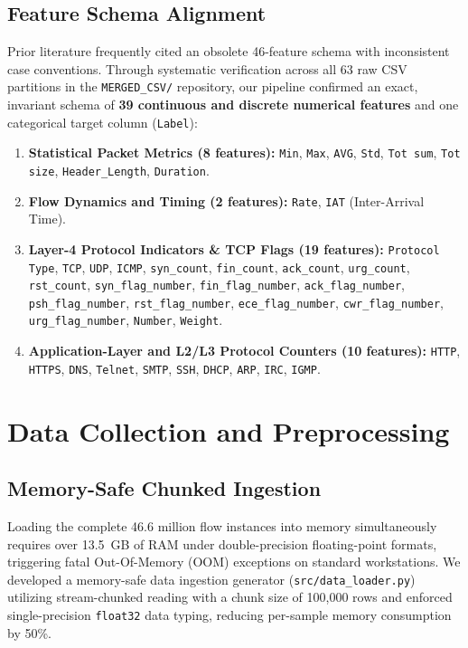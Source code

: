 \documentclass[12pt,a4paper]{report}
\begin{document}
\subsection{Feature Schema Alignment}
Prior literature frequently cited an obsolete 46-feature schema with inconsistent case conventions. Through systematic verification across all 63 raw CSV partitions in the \texttt{MERGED\_CSV/} repository, our pipeline confirmed an exact, invariant schema of \textbf{39 continuous and discrete numerical features} and one categorical target column (\texttt{Label}):
\begin{enumerate}
    \item \textbf{Statistical Packet Metrics (8 features):} \texttt{Min}, \texttt{Max}, \texttt{AVG}, \texttt{Std}, \texttt{Tot sum}, \texttt{Tot size}, \texttt{Header\_Length}, \texttt{Duration}.
    \item \textbf{Flow Dynamics and Timing (2 features):} \texttt{Rate}, \texttt{IAT} (Inter-Arrival Time).
    \item \textbf{Layer-4 Protocol Indicators \& TCP Flags (19 features):} \texttt{Protocol Type}, \texttt{TCP}, \texttt{UDP}, \texttt{ICMP}, \texttt{syn\_count}, \texttt{fin\_count}, \texttt{ack\_count}, \texttt{urg\_count}, \texttt{rst\_count}, \texttt{syn\_flag\_number}, \texttt{fin\_flag\_number}, \texttt{ack\_flag\_number}, \texttt{psh\_flag\_number}, \texttt{rst\_flag\_number}, \texttt{ece\_flag\_number}, \texttt{cwr\_flag\_number}, \texttt{urg\_flag\_number}, \texttt{Number}, \texttt{Weight}.
    \item \textbf{Application-Layer and L2/L3 Protocol Counters (10 features):} \texttt{HTTP}, \texttt{HTTPS}, \texttt{DNS}, \texttt{Telnet}, \texttt{SMTP}, \texttt{SSH}, \texttt{DHCP}, \texttt{ARP}, \texttt{IRC}, \texttt{IGMP}.
\end{enumerate}

\section{Data Collection and Preprocessing}
\subsection{Memory-Safe Chunked Ingestion}
Loading the complete 46.6 million flow instances into memory simultaneously requires over 13.5~GB of RAM under double-precision floating-point formats, triggering fatal Out-Of-Memory (OOM) exceptions on standard workstations. We developed a memory-safe data ingestion generator (\texttt{src/data\_loader.py}) utilizing stream-chunked reading with a chunk size of 100,000 rows and enforced single-precision \texttt{float32} data typing, reducing per-sample memory consumption by 50\%.
\end{document}
